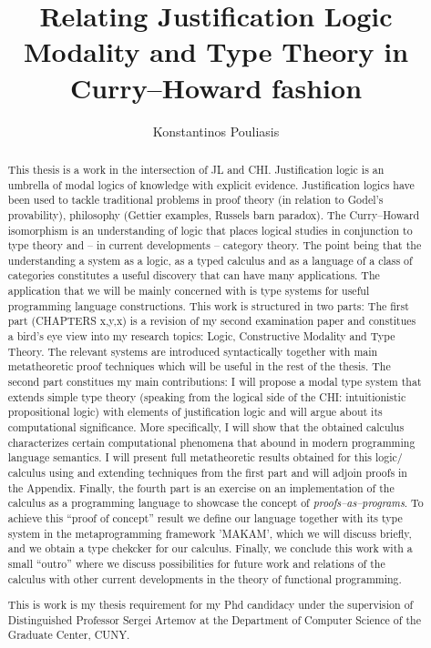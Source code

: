 \documentclass[12pt]{report}
\title{Relating Justification Logic Modality and Type Theory in Curry--Howard fashion}
\author{Konstantinos Pouliasis}
\begin{document}
\maketitle


\begin{abstract}
This thesis is a work in the intersection of \ac{JL} and \ac{CHI}. Justification logic is an umbrella of modal logics of knowledge with explicit evidence. 
Justification logics have been used to tackle traditional problems in proof theory (in relation to Godel's provability), philosophy (Gettier examples, Russels barn paradox). 
The Curry--Howard isomorphism is an understanding of logic that places logical studies in conjunction to type theory and -- in current developments -- 
category theory. The point being that the  understanding a system as a logic, as a typed calculus and as a language of a class of categories constitutes a useful discovery 
that can have many applications.
The application that we will be mainly concerned with is type systems for useful programming language constructions. 
This work  is structured in two parts: 
The first part (CHAPTERS x,y,x) is a revision of my second examination paper and constitues a bird's eye view into my research topics:  
Logic, Constructive Modality and Type Theory. 
The relevant systems are introduced syntactically together with main  metatheoretic proof techniques which will be useful in the rest of the thesis.
The second part constitues my main contributions: I will propose  a modal type system that extends simple type theory (speaking from the logical side of the \ac{CHI}: 
intuitionistic propositional logic) with elements of justification logic and will argue about its computational significance. More specifically, I will show  
that the obtained calculus characterizes  certain computational phenomena that abound in modern programming language semantics. 
I will present full metatheoretic
results obtained for this logic/ calculus using and extending techniques from the first part and will adjoin proofs in the Appendix.
Finally, the fourth part is an exercise
on an implementation of the calculus as a programming language to showcase the concept of \emph{proofs--as--programs}. To achieve this ``proof of concept'' result we define our 
language together with its type system
in the metaprogramming framework 'MAKAM', which we will discuss briefly, 
and we obtain a type chekcker for our calculus. Finally, we conclude this work with a small ``outro'' 
where we discuss possibilities for future work and relations of the calculus with other current developments in the theory of functional programming.

This is work is my thesis requirement for my Phd candidacy under the supervision of Distinguished Professor Sergei Artemov at the Department of 
Computer Science of the Graduate Center, CUNY.
\end{abstract}

\tableofcontents










\nocite{Pfenning2009a, Pfenning2009b}




\end{document}

